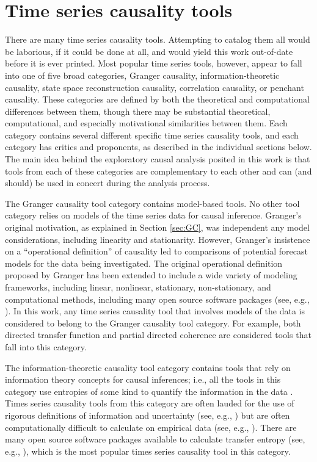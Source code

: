 \documentclass{article}[10pt]
\begin{document}
\section{Time series causality tools}
\label{sec:tools}
There are many time series causality tools.  Attempting to catalog them all would be laborious, if it could be done at all, and would yield this work out-of-date before it is ever printed.  Most popular time series tools, however, appear to fall into one of five broad categories, Granger causality, information-theoretic causality, state space reconstruction causality, correlation causality, or penchant causality.  These categories are defined by both the theoretical and computational differences between them, though there may be substantial theoretical, computational, and especially motivational similarities between them.  Each category contains several different specific time series causality tools, and each category has critics and proponents, as described in the individual sections below.  The main idea behind the exploratory causal analysis posited in this work is that tools from each of these categories are complementary to each other and can (and should) be used in concert during the analysis process.

The Granger causality tool category contains model-based tools.  No other tool category relies on models of the time series data for causal inference.  Granger's original motivation, as explained in Section \ref{sec:GC}, was independent any model considerations, including linearity and stationarity.  However, Granger's insistence on a ``operational definition'' of causality \cite{Granger1963} led to comparisons of potential forecast models for the data being investigated.  The original operational definition proposed by Granger has been extended to include a wide variety of modeling frameworks, including linear, nonlinear, stationary, non-stationary, and computational methods, including many open source software packages (see, e.g., \cite{Cui2008,Luo2013,Tana2012,Barnett2014,Zang2012,Seth2010}).  In this work, any time series causality tool that involves models of the data is considered to belong to the Granger causality tool category.  For example, both directed transfer function \cite{Kaminski1991} and partial directed coherence \cite{Baccala2001} are considered tools that fall into this category.

The information-theoretic causality tool category contains tools that rely on information theory concepts for causal inferences; i.e., all the tools in this category use entropies of some kind to quantify the information in the data \cite{ITbook_placeholder}.  Times series causality tools from this category are often lauded for the use of rigorous definitions of information and uncertainty (see, e.g., \cite{Schindler2007}) but are often computationally difficult to calculate on empirical data (see, e.g., \cite{Kaiser2002}).  There are many open source software packages available to calculate transfer entropy (see, e.g., \cite{Wibral2014,Lindner2011,Montalto2014,Lizier2014}), which is the most popular times series causality tool in this category.  
\end{document}
